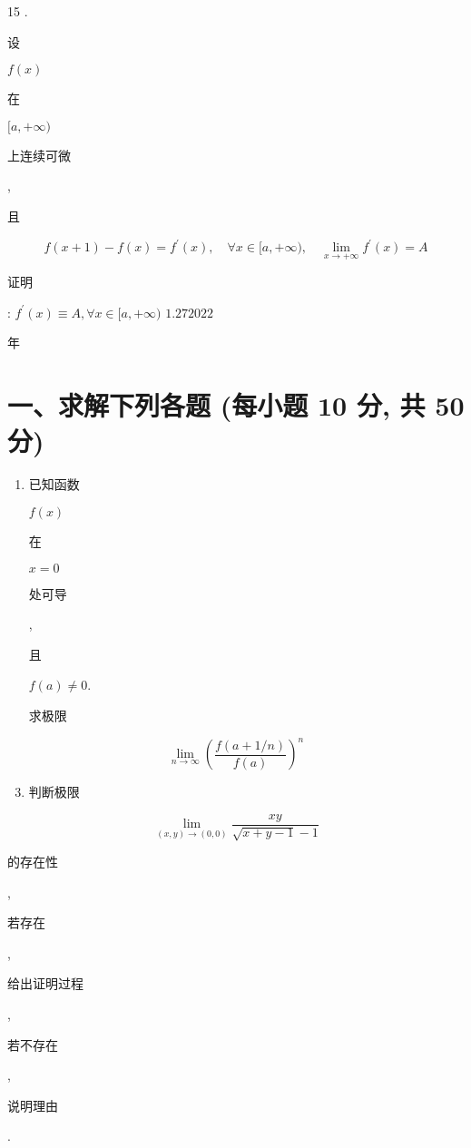 \documentclass[10pt]{article}
\begin{document}
15 . \begin{CJK}{UTF8}{mj}设\end{CJK} $f(x)$ \begin{CJK}{UTF8}{mj}在\end{CJK} $[a,+\infty)$ \begin{CJK}{UTF8}{mj}上连续可微\end{CJK}, \begin{CJK}{UTF8}{mj}且\end{CJK}
$$
f(x+1)-f(x)=f^{\prime}(x), \quad \forall x \in[a,+\infty), \quad \lim _{x \rightarrow+\infty} f^{\prime}(x)=A
$$
\begin{CJK}{UTF8}{mj}证明\end{CJK}: $f^{\prime}(x) \equiv A, \forall x \in[a,+\infty)$ $1.272022$ \begin{CJK}{UTF8}{mj}年\end{CJK}

\section{一、求解下列各题 (每小题 $\mathbf{1 0}$ 分, 共 $\mathbf{5 0}$ 分)}
\begin{enumerate}
  \item \begin{CJK}{UTF8}{mj}已知函数\end{CJK} $f(x)$ \begin{CJK}{UTF8}{mj}在\end{CJK} $x=0$ \begin{CJK}{UTF8}{mj}处可导\end{CJK}, \begin{CJK}{UTF8}{mj}且\end{CJK} $f(a) \neq 0$. \begin{CJK}{UTF8}{mj}求极限\end{CJK}
\end{enumerate}
$$
\lim _{n \rightarrow \infty}\left(\frac{f(a+1 / n)}{f(a)}\right)^{n}
$$

\begin{enumerate}
  \setcounter{enumi}{2}
  \item \begin{CJK}{UTF8}{mj}判断极限\end{CJK}
\end{enumerate}
$$
\lim _{(x, y) \rightarrow(0,0)} \frac{x y}{\sqrt{x+y-1}-1}
$$
\begin{CJK}{UTF8}{mj}的存在性\end{CJK}, \begin{CJK}{UTF8}{mj}若存在\end{CJK}, \begin{CJK}{UTF8}{mj}给出证明过程\end{CJK}, \begin{CJK}{UTF8}{mj}若不存在\end{CJK}, \begin{CJK}{UTF8}{mj}说明理由\end{CJK}.
\end{document}
